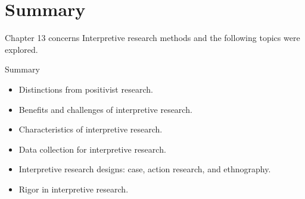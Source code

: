 \section{Summary}\label{ch13:summary}

Chapter 13 concerns Interpretive research methods and the following topics were explored.

\begin{center}
	\begin{tkawybox}{Summary}
		\begin{itemize}
			\setlength{\itemsep}{0pt}
			\setlength{\parskip}{0pt}
			\setlength{\parsep}{0pt}
			
			\item Distinctions from positivist research.
			\item Benefits and challenges of interpretive research.
			\item Characteristics of interpretive research.
			\item Data collection for interpretive research.
			\item Interpretive research designs: case, action research, and ethnography.
			\item Rigor in interpretive research.
		\end{itemize}
	\end{tkawybox}
\end{center}
